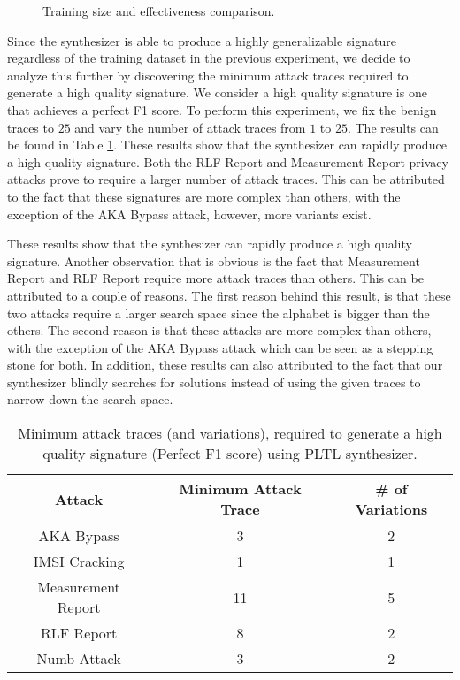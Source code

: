 \begin{figure}[t]
	\centering
	\resizebox{.8\columnwidth}{!}{}
	\caption{Training size and effectiveness comparison.
	}
	\label{fig:effectiveness_vs_sample_size}
\end{figure}

Since the \pltl synthesizer is able to produce a highly generalizable
signature regardless of the training dataset in the previous experiment,
we decide to analyze this further by discovering the minimum attack traces
required to generate a high quality signature. We consider a high quality signature is
one that achieves a perfect F1 score. To perform this experiment, we fix
the benign traces to $25$ and vary the number of attack traces from $1$ to $25$.
The results can be found in
Table \ref{tab:minimum_attack_traces}. These results show that the \pltl synthesizer
can rapidly produce a high quality signature. Both the RLF Report and Measurement
Report privacy attacks prove to require a larger number of attack traces.
This can be attributed to the fact that these signatures are more complex than
others, with the exception of the AKA Bypass attack, however, more variants exist.


 These results show that the \pltl
synthesizer can rapidly produce a high quality signature.
Another observation that is obvious is the fact that Measurement Report and
RLF Report require more attack traces than others. This can be attributed to a couple
of reasons. The first reason behind this result, is that these two attacks require a
larger search space since the alphabet is bigger than the others. The second
reason is that these attacks are more complex than others, with the exception
of the AKA Bypass attack which can be seen as a stepping stone for both. In addition,
these results can also attributed to the fact that our \pltl synthesizer blindly
searches for solutions instead of using the given traces to narrow down the search
space.

\begin{table}[]
  \centering

\begin{tabular}{|c|c|c|}
\hline
\textbf{Attack} & \textbf{Minimum Attack Trace} & \textbf{\# of Variations} \\ \hline
AKA Bypass & 3 & 2 \\ \hline
IMSI Cracking & 1 & 1 \\ \hline
Measurement Report & 11 & 5 \\ \hline
RLF Report & 8 & 2 \\ \hline
Numb Attack & 3 & 2 \\ \hline
\end{tabular}
\caption{Minimum attack traces (and variations), required to generate a high quality signature (Perfect F1 score) using PLTL synthesizer.}
\label{tab:minimum_attack_traces}
\end{table}





